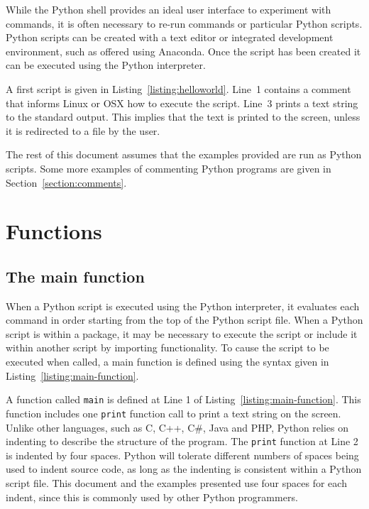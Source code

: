 \documentclass[11pt,a4paper]{article}
\begin{document}
While the Python shell provides an ideal user interface to experiment with commands, it is often necessary to re-run commands or particular Python scripts.  Python scripts can be created with a text editor or integrated development environment, such as offered using Anaconda.  Once the script has been created it can be executed using the Python interpreter.

A first script is given in Listing~\ref{listing:helloworld}.  Line~1 contains a comment that informs Linux or OSX how to execute the script.  Line~3 prints a text string to the standard output.  This implies that the text is printed to the screen, unless it is redirected to a file by the user.



The rest of this document assumes that the examples provided are run as Python scripts.  Some more examples of commenting Python programs are given in Section~\ref{section:comments}.

\section{Functions}

\subsection{The main function}

When a Python script is executed using the Python interpreter, it evaluates each command in order starting from the top of the Python script file.  When a Python script is within a package, it may be necessary to execute the script or include it within another script by importing functionality.  To cause the script to be executed when called, a main function is defined using the syntax given in Listing~\ref{listing:main-function}.



A function called \texttt{main} is defined at Line 1 of Listing~\ref{listing:main-function}.  This function includes one \texttt{print} function call to print a text string on the screen.   Unlike other languages, such as C, C++, C\#, Java and PHP, Python relies on indenting to describe the structure of the program.  The \texttt{print} function at Line 2 is indented by four spaces.  Python will tolerate different numbers of spaces being used to indent source code, as long as the indenting is consistent within a Python script file.  This document and the examples presented use four spaces for each indent, since this is commonly used by other Python programmers.
\end{document}
